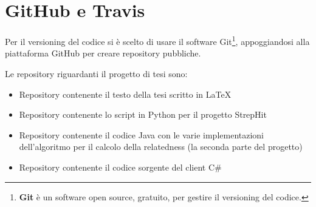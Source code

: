 
\section{GitHub e Travis}
Per il versioning del codice si è scelto di usare il software Git\footnote{
    \textbf{Git}\cite{git} è un software open source, gratuito, per gestire il versioning del codice.
}, appoggiandosi alla piattaforma GitHub per creare repository pubbliche. 

Le repository riguardanti il progetto di tesi sono:

\begin{itemize}
    \item Repository contenente il testo della tesi scritto in \LaTeX\cite{latex-repo}\\
    \item Repository contenente lo script in Python per il progetto StrepHit\cite{strephit-repo}\\
    \item Repository contenente il codice Java con le varie implementazioni dell'algoritmo per il calcolo della relatedness (la seconda parte del progetto)\cite{dandelion-repo}\\
    \item Repository contenente il codice sorgente del client C$\#$\cite{client-repo} \\
\end{itemize} 

